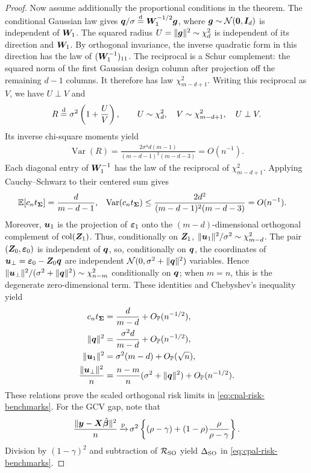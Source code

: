\documentclass{article}
\theoremstyle{plain} %
\theoremstyle{definition} %
\theoremstyle{definition} %
\begin{document}
\begin{proof}
Now assume additionally the proportional conditions in the theorem.
The conditional Gaussian law gives
$\boldsymbol{q}/\sigma\stackrel{\rm d}{=}\boldsymbol{W}_1^{-1/2}\boldsymbol{g}$, where
$\boldsymbol{g}\sim{\mathcal N}(\mathbf{0},\boldsymbol{I}_d)$ is independent of $\boldsymbol{W}_1$.
The squared radius $U=\lVert\boldsymbol{g}\rVert^2\sim\chi^2_d$ is independent of its
direction and $\boldsymbol{W}_1$. By orthogonal invariance, the inverse quadratic
form in this direction has the law of $(\boldsymbol{W}_1^{-1})_{11}$.
The reciprocal is a Schur complement: the squared norm of the first
Gaussian design column after projection off the remaining $d-1$ columns.
It therefore has law $\chi^2_{m-d+1}$. Writing this reciprocal as $V$,
we have $U\perp V$ and
\begin{align*}
    R\stackrel{\rm d}{=}\sigma^2\left(1+\frac UV\right),
    \qquad U\sim\chi^2_d,\quad V\sim\chi^2_{m-d+1},
    \quad U\perp V.
\end{align*}
Its inverse chi-square moments yield
\begin{align*}
    \operatorname{Var}(R)
    =\frac{2\sigma^4d(m-1)}{(m-d-1)^2(m-d-3)}=O(n^{-1}).
\end{align*}
Each diagonal entry of $\boldsymbol{W}_1^{-1}$ has the law of the reciprocal of
$\chi^2_{m-d+1}$. Applying Cauchy--Schwarz to their centered sum gives
\begin{align*}
    {\mathbb{E}}[c_nt_{\boldsymbol{\Sigma}}]&=\frac{d}{m-d-1},
    &\operatorname{Var}(c_nt_{\boldsymbol{\Sigma}})
      &\leq\frac{2d^2}{(m-d-1)^2(m-d-3)}=O(n^{-1}).
\end{align*}
Moreover, $\boldsymbol{u}_1$ is the projection of ${\boldsymbol{\varepsilon} }_1$ onto the
$(m-d)$-dimensional orthogonal complement of
$\operatorname{col}(\boldsymbol{Z}_1)$. Thus, conditionally on $\boldsymbol{Z}_1$,
$\lVert\boldsymbol{u}_1\rVert^2/\sigma^2\sim\chi^2_{m-d}$.
The pair $(\boldsymbol{Z}_0,{\boldsymbol{\varepsilon} }_0)$ is independent of $\boldsymbol{q}$, so,
conditionally on $\boldsymbol{q}$, the coordinates of
$\boldsymbol{u}_\perp={\boldsymbol{\varepsilon} }_0-\boldsymbol{Z}_0\boldsymbol{q}$ are independent
${\mathcal N}(0,\sigma^2+\lVert\boldsymbol{q}\rVert^2)$ variables. Hence
$\lVert\boldsymbol{u}_\perp\rVert^2/(\sigma^2+\lVert\boldsymbol{q}\rVert^2)\sim\chi^2_{n-m}$
conditionally on $\boldsymbol{q}$; when $m=n$, this is the degenerate
zero-dimensional term.
These identities and Chebyshev's inequality yield
\begin{align*}
    c_nt_{\boldsymbol{\Sigma}}&=\frac{d}{m-d}+O_{{\mathbb{P}}}(n^{-1/2}),\\
    \lVert\boldsymbol{q}\rVert^2&=\frac{\sigma^2d}{m-d}+O_{{\mathbb{P}}}(n^{-1/2}),\\
    \lVert\boldsymbol{u}_1\rVert^2&=\sigma^2(m-d)+O_{{\mathbb{P}}}(\sqrt n),\\
    \frac{\lVert\boldsymbol{u}_\perp\rVert^2}{n}
    &=\frac{n-m}{n}(\sigma^2+\lVert\boldsymbol{q}\rVert^2)
      +O_{{\mathbb{P}}}(n^{-1/2}).
\end{align*}
These relations prove the scaled orthogonal risk limits in
\eqref{eq:cpal-risk-benchmarks}. For the GCV gap,
note that
\begin{align*}
    \frac{\lVert\boldsymbol{y}-\boldsymbol{X}\hat{\boldsymbol{\beta}}{}\rVert^2}{n}
    {\,\smash{\xrightarrow{\mathrm{p}}}}\,
    \sigma^2\left\{(\rho-\gamma)
      +(1-\rho)\frac{\rho}{\rho-\gamma}\right\}.
\end{align*}
Division by $(1-\gamma)^2$ and subtraction of ${\mathcal R}_{\rm SO}$
yield $\Delta_{\rm SO}$ in \eqref{eq:cpal-risk-benchmarks}.
\end{proof}
\end{document}
